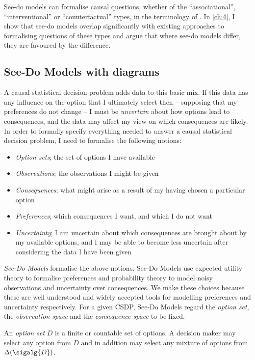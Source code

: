 See-do models can formalise causal questions, whether of the ``associational'', ``interventional'' or ``counterfactual'' types, in the terminology of \citet{pearl_book_2018}. In \ref{ch:4}, I show that see-do models overlap significantly with existing approaches to formalising questions of these types and argue that where see-do models differ, they are favoured by the difference.

\subsection{See-Do Models with diagrams}



A causal statistical decision problem adds data to this basic mix. If this data has any influence on the option that I ultimately select then -- supposing that my preferences do not change -- I must be \emph{uncertain} about how options lead to consequences, and the data may affect my view on which consequences are likely. In order to formally specify everything needed to answer a causal statistical decision problem, I need to formalise the following notions:

\begin{itemize}
    \item \emph{Option sets}; the set of options I have available
    \item \emph{Observations}; the observations I might be given
    \item \emph{Consequences}; what might arise as a result of my having chosen a particular option
    \item \emph{Preferences}; which consequences I want, and which I do not want
    \item \emph{Uncertainty}; I am uncertain about which consequences are brought about by my available options, and I may be able to become less uncertain after considering the data I have been given
\end{itemize}

\emph{See-Do Models} formalise the above notions. See-Do Models use expected utility theory to formalise preferences and probability theory to model noisy observations and uncertainty over consequences. We make these choices because these are well understood and widely accepted tools for modelling preferences and uncertainty respectively. For a given CSDP, See-Do Models regard the \emph{option set}, the \emph{observation space} and the \emph{consequence space} to be fixed.

\begin{definition}
An \emph{option set} $D$ is a finite or countable set of options. A decision maker may select any option from $D$ and in addition may select any mixture of options from $\Delta(\sigalg{D})$.
\end{definition}

